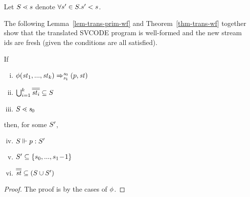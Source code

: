 \begin{itemize}
	\\ [8ex]

	\\[4ex]
	
\end{itemize}


\begin{nota}
	Let $\S \.< s$ denote $\forall s' \in \S. s' < s$.
\end{nota}


The following Lemma~\ref{lem-trans-prim-wf} and Theorem~\ref{thm-trans-wf} together show that the translated SVCODE program is well-formed and the new stream ids are fresh (given the conditions are all satisfied).


\begin{lem} \label{lem-trans-prim-wf}
	If 
	\begin{enumerate}[(i)]
		\item $\Transf{\hcall}{\replc k {\st}} {\s_0} {\s_1} {\sfun{p}{\st}}$ 
		\item $\bigcup_{i=1}^{k}\olol{\st_i} \subseteq \S$
		\item $\S \.< \s_0$
	\end{enumerate}
	then, for some $\S'$,
	\begin{enumerate}[(i)]
		\setcounter{enumi}{3}
		\item $\wf{p}{\S}{\S'}$
		\item $\S' \subseteq \{s_0,...,s_1\!-\!1\} $
		\item $\olol{\st} \subseteq (\S \cup \S')$
	\end{enumerate}
\end{lem}
\begin{proof}
    The proof is by the cases of $\hcall$.
\end{proof}


